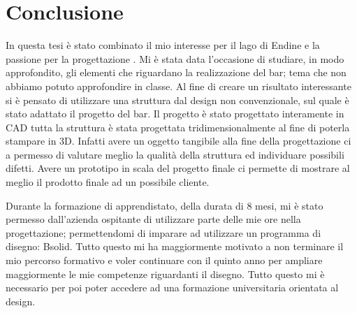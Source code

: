 \section{Conclusione}


In questa tesi è stato combinato il mio interesse per il lago di Endine e la passione per la progettazione . Mi è stata data l’occasione di  studiare, in modo approfondito, gli elementi che riguardano la realizzazione del bar; tema che non abbiamo potuto approfondire in classe. Al fine di creare un risultato interessante si è pensato di utilizzare  una struttura dal design non convenzionale, sul quale è stato adattato il progetto del bar. Il progetto è stato progettato interamente in CAD tutta la struttura è stata progettata tridimensionalmente al fine di poterla stampare in 3D. Infatti avere un oggetto tangibile alla fine della progettazione ci a permesso di valutare meglio la qualità della struttura ed individuare possibili difetti. Avere un prototipo in scala del progetto finale ci permette di mostrare al meglio il prodotto finale ad un possibile cliente.

Durante la formazione di apprendistato, della durata di 8 mesi, mi è stato permesso dall'azienda ospitante di utilizzare parte delle mie ore  nella progettazione; permettendomi  di imparare ad utilizzare un programma di disegno: Bsolid. Tutto questo mi ha maggiormente motivato a non terminare il mio percorso formativo e voler continuare con il quinto anno per ampliare maggiormente le mie competenze riguardanti il disegno. Tutto questo mi è necessario per poi poter accedere ad una formazione universitaria orientata al design. \\

\noindent
\cite{maggioli} \cite{endine} \cite{-_di_-_tecnica_here_2017} \cite{commercio} \cite{decreto}  \cite{design}
\cite{banconemis} \cite{bancone}  \cite{celle}
 \cite{caffe} \cite{decreto2} \cite{acqua} \cite{argine} \cite{documenti} \cite{barriere}

